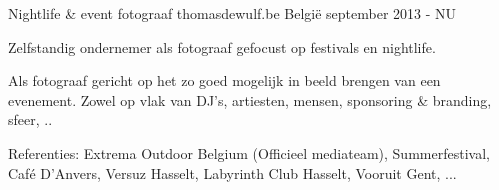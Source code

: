 \cventry
{Nightlife \& event fotograaf} %
{thomasdewulf.be} %
{België} %
{september 2013 - NU} %
{ %
\begin{cvitems}
\item {Zelfstandig ondernemer als fotograaf gefocust op festivals en nightlife. }
\item {Als fotograaf gericht op het zo goed mogelijk in beeld brengen van een evenement. Zowel op vlak van DJ's, artiesten, mensen, sponsoring \& branding, sfeer, ..}
\item {Referenties: Extrema Outdoor Belgium (Officieel mediateam), Summerfestival, Café D'Anvers, Versuz Hasselt, Labyrinth Club Hasselt, Vooruit Gent, ...}
\end{cvitems}
}